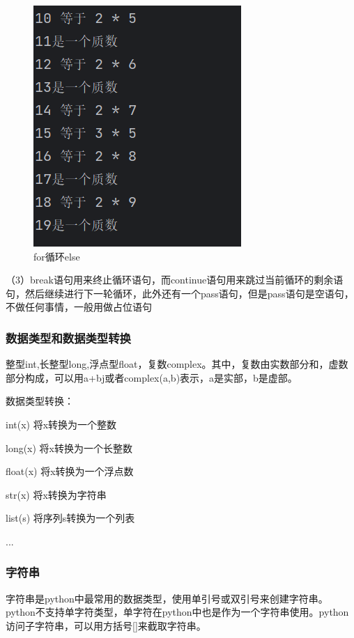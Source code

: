\documentclass{ctexart}
\begin{document}
	\begin{figure}[H]
		\centering
		\includegraphics[scale=0.5]{3.22}
		\caption{for循环else}
	\end{figure}
	
	（3）break语句用来终止循环语句，而continue语句用来跳过当前循环的剩余语句，然后继续进行下一轮循环，此外还有一个pass语句，但是pass语句是空语句，不做任何事情，一般用做占位语句
	
	\subsubsection{数据类型和数据类型转换}
	
	整型int,长整型long,浮点型float，复数complex。其中，复数由实数部分和，虚数部分构成，可以用a+bj或者complex(a,b)表示，a是实部，b是虚部。
	
	数据类型转换：
	
	int(x) 将x转换为一个整数
	
	long(x) 将x转换为一个长整数
	
	float(x) 将x转换为一个浮点数
	
	str(x) 将x转换为字符串
	
	list(s) 将序列s转换为一个列表
	
	
	...
	
	\subsubsection{字符串}
	
	字符串是python中最常用的数据类型，使用单引号或双引号来创建字符串。python不支持单字符类型，单字符在python中也是作为一个字符串使用。python访问子字符串，可以用方括号[]来截取字符串。
	
\end{document}
